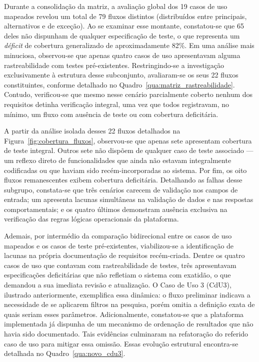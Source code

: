 

Durante a consolidação da matriz, a avaliação global dos 19 casos de uso mapeados revelou um total de 79 fluxos distintos (distribuídos entre principais, alternativos e de exceção). Ao se examinar esse montante, constatou-se que 65 deles não dispunham de qualquer especificação de teste, o que representa um \textit{déficit} de cobertura generalizado de aproximadamente 82\%. Em uma análise mais minuciosa, observou-se que apenas quatro casos de uso apresentavam alguma rastreabilidade com testes pré-existentes. Restringindo-se a investigação exclusivamente à estrutura desse subconjunto, avaliaram-se os seus 22 fluxos constituintes, conforme detalhado no Quadro~\ref{qua:matriz_rastreabilidade}. Contudo, verificou-se que mesmo nesse cenário parcialmente coberto nenhum dos requisitos detinha verificação integral, uma vez que todos registravam, no mínimo, um fluxo com ausência de teste ou com cobertura deficitária.







A partir da análise isolada desses 22 fluxos detalhados na Figura~\ref{fig:cobertura_fluxos}, observou-se que apenas sete apresentam cobertura de teste integral. Outros sete não dispõem de qualquer caso de teste associado — um reflexo direto de funcionalidades que ainda não estavam integralmente codificadas ou que haviam sido recém-incorporadas ao sistema. Por fim, os oito fluxos remanescentes exibem cobertura deficitária. Detalhando as falhas desse subgrupo, constata-se que três cenários carecem de validação nos campos de entrada; um apresenta lacunas simultâneas na validação de dados e nas respostas comportamentais; e os quatro últimos demonstram ausência exclusiva na verificação das regras lógicas operacionais da plataforma.

Ademais, por intermédio da comparação bidirecional entre os casos de uso mapeados e os casos de teste pré-existentes, viabilizou-se a identificação de lacunas na própria documentação de requisitos recém-criada. Dentre os quatro casos de uso que contavam com rastreabilidade de testes, três apresentavam especificações deficitárias que não refletiam o sistema com exatidão, o que demandou a sua imediata revisão e atualização. O Caso de Uso 3 (CdU3), ilustrado anteriormente, exemplifica essa dinâmica: o fluxo preliminar indicava a necessidade de se aplicarem filtros na pesquisa, porém omitia a definição exata de quais seriam esses parâmetros. Adicionalmente, constatou-se que a plataforma implementada já dispunha de um mecanismo de ordenação de resultados que não havia sido documentado. Tais evidências culminaram na refatoração do referido caso de uso para mitigar essa omissão. Essas evolução estrutural encontra-se detalhada no Quadro~\ref{qua:novo_cdu3}.

